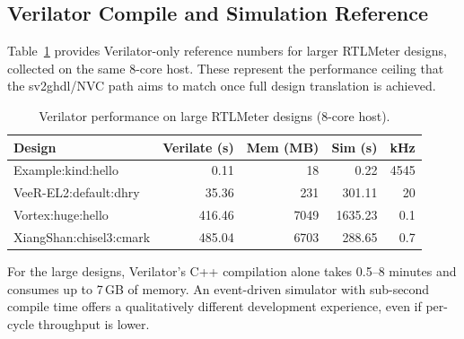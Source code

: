\subsection{Verilator Compile and Simulation Reference}

Table~\ref{tab:verilator} provides Verilator-only reference numbers for larger
RTLMeter designs, collected on the same 8-core host.  These represent the
performance ceiling that the sv2ghdl/NVC path aims to match once full design
translation is achieved.

\begin{table}[h]
\centering
\caption{Verilator performance on large RTLMeter designs (8-core host).}
\label{tab:verilator}
\begin{tabular}{lrrrr}
\hline
\textbf{Design} & \textbf{Verilate (s)} & \textbf{Mem (MB)} & \textbf{Sim (s)} & \textbf{kHz} \\
\hline
Example:kind:hello              &    0.11 &     18 &    0.22 & 4545 \\
VeeR-EL2:default:dhry           &   35.36 &    231 &  301.11 &   20 \\
Vortex:huge:hello               &  416.46 &  7049  & 1635.23 &  0.1 \\
XiangShan:chisel3:cmark         &  485.04 &  6703  &  288.65 &  0.7 \\
\hline
\end{tabular}
\end{table}

For the large designs, Verilator's C++ compilation alone takes 0.5--8 minutes
and consumes up to 7\,GB of memory.  An event-driven simulator with
sub-second compile time offers a qualitatively different development
experience, even if per-cycle throughput is lower.
